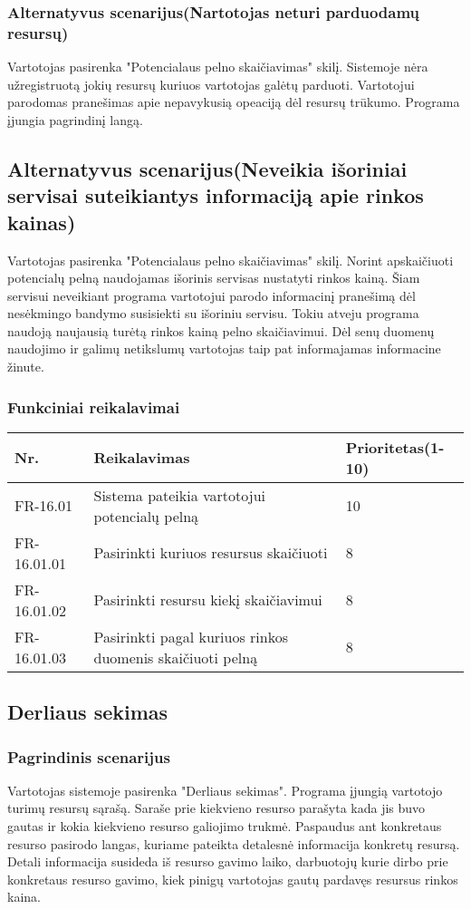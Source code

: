 \documentclass[oneside]{VUMIFPSkursinis}
\begin{document}
	\subsubsection{Alternatyvus scenarijus(Nartotojas neturi parduodamų resursų)}
	Vartotojas pasirenka "Potencialaus pelno skaičiavimas" skilį. Sistemoje nėra užregistruotą jokių resursų kuriuos vartotojas galėtų parduoti. Vartotojui parodomas pranešimas apie nepavykusią opeaciją dėl resursų trūkumo. Programa įjungia pagrindinį langą. 
	\subsection{Alternatyvus scenarijus(Neveikia išoriniai servisai suteikiantys informaciją apie rinkos kainas)}
	Vartotojas pasirenka "Potencialaus pelno skaičiavimas" skilį. Norint apskaičiuoti potencialų pelną naudojamas išorinis servisas nustatyti rinkos kainą. Šiam servisui neveikiant programa vartotojui parodo informacinį pranešimą dėl nesėkmingo bandymo susisiekti su išoriniu servisu. Tokiu atveju programa naudoją naujausią turėtą rinkos kainą pelno skaičiavimui. Dėl senų duomenų naudojimo ir galimų netikslumų vartotojas taip pat informajamas informacine žinute.
	\subsubsection{Funkciniai reikalavimai}
\begin{table}[htbp]
	\begin{tabularx}{1\textwidth}{ |P{2.5cm}|X|P{3cm }| }  \hline
		Nr. & Reikalavimas & Prioritetas(1-10) \\ \hline
		FR-16.01 & Sistema pateikia vartotojui potencialų pelną & 10 \\ \hline
		FR-16.01.01 & Pasirinkti kuriuos resursus skaičiuoti & 8 \\ \hline
		FR-16.01.02 & Pasirinkti resursu kiekį skaičiavimui & 8 \\ \hline
		FR-16.01.03 & Pasirinkti pagal kuriuos rinkos duomenis skaičiuoti pelną & 8 \\ \hline
	\end{tabularx}
\end{table}	
	 
\subsection{Derliaus sekimas}
	\subsubsection{Pagrindinis scenarijus}
	Vartotojas sistemoje pasirenka "Derliaus sekimas". Programa įjungią vartotojo turimų resursų sąrašą. Saraše prie kiekvieno resurso parašyta kada jis buvo gautas ir kokia kiekvieno resurso galiojimo trukmė. Paspaudus ant konkretaus resurso pasirodo langas, kuriame pateikta detalesnė informacija konkretų resursą. Detali informacija susideda iš resurso gavimo laiko, darbuotojų kurie dirbo prie konkretaus resurso gavimo, kiek pinigų vartotojas gautų pardavęs resursus rinkos kaina.
\end{document}
